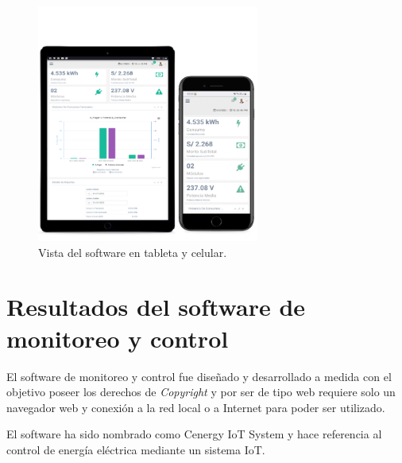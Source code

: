 \vspace{1.0cm}
\begin{figure}[htpb]
\centering 
\includegraphics[width=0.65\textwidth]{./Figures/responsive2.png}
\caption{Vista del software en tableta y celular.}
\label{fig:software2}
\end{figure}

\section{Resultados del software de monitoreo y control}

El software de monitoreo y control fue diseñado y desarrollado a medida con el objetivo poseer los derechos de \emph{Copyright} y por ser de tipo web requiere solo un navegador web y conexión a la red local o a Internet para poder ser utilizado. 

El software ha sido nombrado como Cenergy IoT System y hace referencia al control de energía eléctrica mediante un sistema IoT.  


